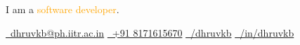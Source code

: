 
\raggedright{I am a \textcolor{orange}{\jetbrainsmono software developer}.}
\vspace{2mm}

\intro
  {\href{mailto:dhruvkb@ph.iitr.ac.in}        {\iconEmail~dhruvkb@ph.iitr.ac.in}}
  {\href{tel:+918171615670}                   {\iconPhone~+91 8171615670}}
  {\href{https://github.com/dhruvkb}          {\iconGitHub~/dhruvkb}}
  {\href{https://www.linkedin.com/in/dhruvkb} {\iconLinkedIn~/in/dhruvkb}}